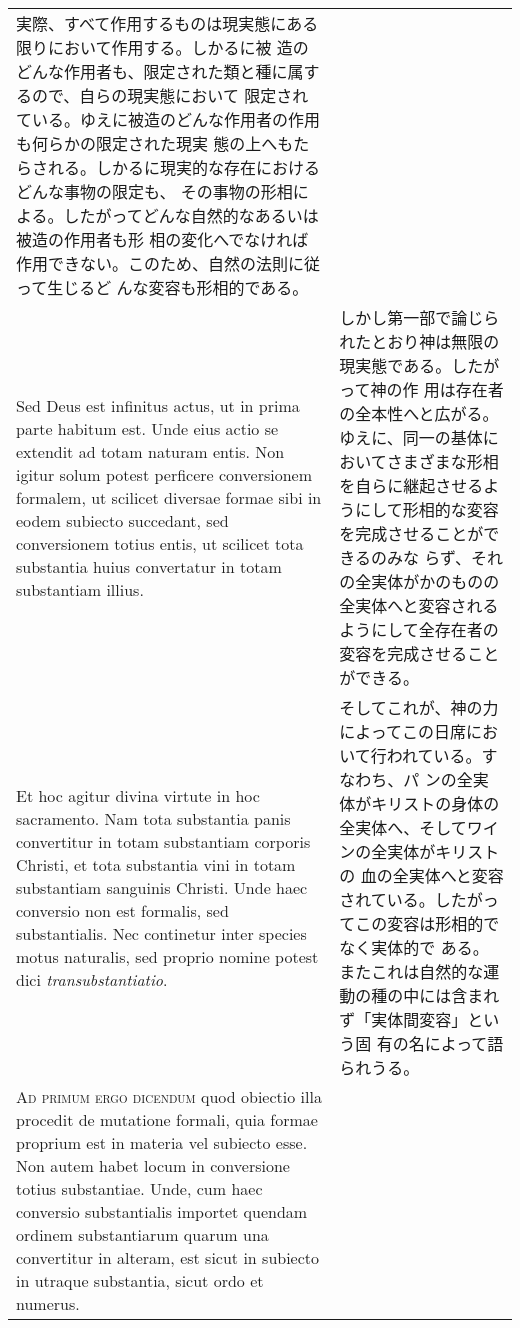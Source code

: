 \documentclass[10pt]{jsarticle} %
\begin{document}
\begin{longtable}{p{21em}p{21em}}
実際、すべて作用するものは現実態にある限りにおいて作用する。しかるに被
造のどんな作用者も、限定された類と種に属するので、自らの現実態において
限定されている。ゆえに被造のどんな作用者の作用も何らかの限定された現実
態の上へもたらされる。しかるに現実的な存在におけるどんな事物の限定も、
その事物の形相による。したがってどんな自然的なあるいは被造の作用者も形
相の変化へでなければ作用できない。このため、自然の法則に従って生じるど
んな変容も形相的である。


\\


Sed Deus est infinitus actus, ut in prima parte habitum est. Unde eius
actio se extendit ad totam naturam entis. Non igitur solum potest
perficere conversionem formalem, ut scilicet diversae formae sibi in
eodem subiecto succedant, sed conversionem totius entis, ut scilicet
tota substantia huius convertatur in totam substantiam illius.

&

しかし第一部で論じられたとおり神は無限の現実態である。したがって神の作
用は存在者の全本性へと広がる。ゆえに、同一の基体においてさまざまな形相
を自らに継起させるようにして形相的な変容を完成させることができるのみな
らず、それの全実体がかのものの全実体へと変容されるようにして全存在者の
変容を完成させることができる。


\\



Et hoc agitur divina virtute in hoc sacramento. Nam tota substantia
panis convertitur in totam substantiam corporis Christi, et tota
substantia vini in totam substantiam sanguinis Christi. Unde haec
conversio non est formalis, sed substantialis. Nec continetur inter
species motus naturalis, sed proprio nomine potest dici {\itshape
transubstantiatio}.

&

そしてこれが、神の力によってこの日席において行われている。すなわち、パ
ンの全実体がキリストの身体の全実体へ、そしてワインの全実体がキリストの
血の全実体へと変容されている。したがってこの変容は形相的でなく実体的で
ある。またこれは自然的な運動の種の中には含まれず「実体間変容」という固
有の名によって語られうる。


\\



{\scshape Ad primum ergo dicendum} quod obiectio illa procedit de
mutatione formali, quia formae proprium est in materia vel subiecto
esse. Non autem habet locum in conversione totius substantiae. Unde,
cum haec conversio substantialis importet quendam ordinem
substantiarum quarum una convertitur in alteram, est sicut in subiecto
in utraque substantia, sicut ordo et numerus.


\end{longtable}
\end{document}
